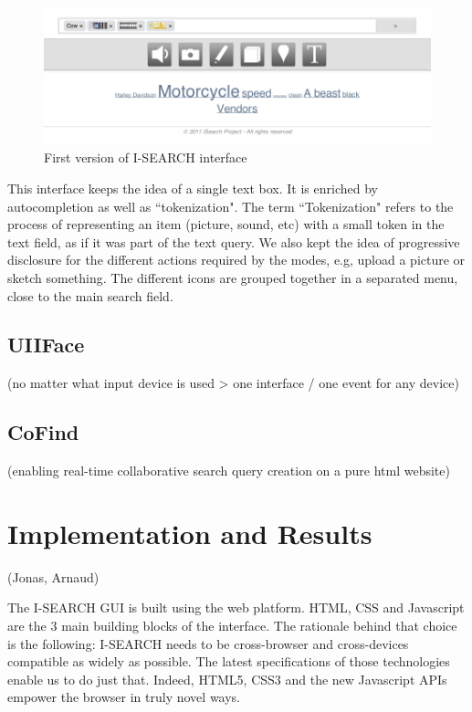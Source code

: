 \documentclass[runningheads,a4paper]{llncs}
\begin{document}
\begin{figure}[h!]
  \centering
    \includegraphics[width=0.8\linewidth]{resources/isearch-UI.png}
  \caption{First version of I-SEARCH interface}
  \label{fig:isearch-ui}
\end{figure}

This interface keeps the idea of a single text box. It is enriched by autocompletion as well as ``tokenization". The term ``Tokenization" refers to the process of representing an item (picture, sound, etc) with a small token in the text field, as if it was part of the text query. We also kept the idea of progressive disclosure for the different actions required by the modes, e.g, upload a picture or sketch something. The different icons are grouped together in a separated menu, close to the main search field.

\subsection{UIIFace}

(no matter what input device is used > one interface / one event for any device) 

\subsection{CoFind}

(enabling real-time collaborative search query creation on a pure html website)

\section{Implementation and Results}
(Jonas, Arnaud)

The I-SEARCH GUI is built using the web platform. HTML, CSS and Javascript are the 3 main building blocks of the interface. The rationale behind that choice is the following: I-SEARCH needs to be cross-browser and cross-devices compatible as widely as possible. The latest specifications of those technologies enable us to do just that. Indeed, HTML5, CSS3 and the new Javascript APIs empower the browser in truly novel ways.
\end{document}
